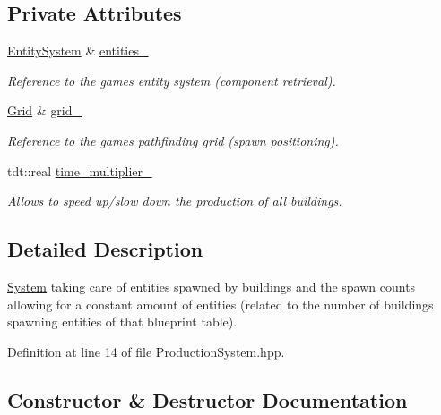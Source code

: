 \subsection*{Private Attributes}
\begin{DoxyCompactItemize}
\item 
\hyperlink{class_entity_system}{Entity\+System} \& \hyperlink{class_production_system_a1635990974ff715fd1ac2035f9760e51}{entities\+\_\+}
\begin{DoxyCompactList}\small\item\em Reference to the game\textquotesingle{}s entity system (component retrieval). \end{DoxyCompactList}\item 
\hyperlink{class_grid}{Grid} \& \hyperlink{class_production_system_a7b57e417c67f4629e5b858b3f55edbf4}{grid\+\_\+}
\begin{DoxyCompactList}\small\item\em Reference to the game\textquotesingle{}s pathfinding grid (spawn positioning). \end{DoxyCompactList}\item 
tdt\+::real \hyperlink{class_production_system_a0d1e37301b0549aa967c561c6f8f876e}{time\+\_\+multiplier\+\_\+}
\begin{DoxyCompactList}\small\item\em Allows to speed up/slow down the production of all buildings. \end{DoxyCompactList}\end{DoxyCompactItemize}


\subsection{Detailed Description}
\hyperlink{class_system}{System} taking care of entities spawned by buildings and the spawn counts allowing for a constant amount of entities (related to the number of buildings spawning entities of that blueprint table). 

Definition at line 14 of file Production\+System.\+hpp.



\subsection{Constructor \& Destructor Documentation}
